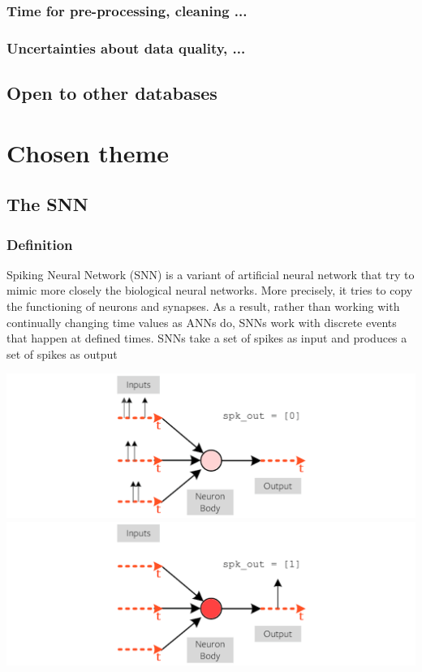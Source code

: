 \documentclass{article}
\begin{document}
\subsubsection{Time for pre-processing, cleaning ...}
\subsubsection{Uncertainties about data quality, ...}
\subsection{Open to other databases}

\section{Chosen theme}
\subsection{The SNN}
\subsubsection{Definition}
Spiking Neural Network (SNN) is a variant of artificial neural network that try to mimic more closely the biological neural networks. More precisely, it tries to copy the functioning of neurons and synapses. As a result, rather than working with continually changing time values as ANNs do, SNNs work with discrete events that happen at defined times. SNNs take a set of spikes as input and produces a set of spikes as output

\begin{center}
  \includegraphics[scale=0.3]{image/def1.png}
  \includegraphics[scale=0.3]{image/def2.png}
\end{center}
\end{document}
